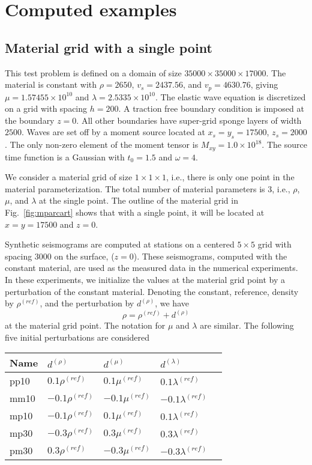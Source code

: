 \documentclass[12pt]{report}
\begin{document}
\chapter{Computed examples}

\section{Material grid with a single point}
This test problem is defined on a domain of size $35000\times 35000\times 17000$.
The material is constant with $\rho=2650$, $v_s=2437.56$, and $v_p=4630.76$, giving
$\mu=1.57455\times 10^{10}$ and $\lambda=2.5335\times 10^{10}$. The elastic wave equation 
is discretized on a grid with spacing $h=200$. A traction free boundary condition is 
imposed at the boundary $z=0$. All other boundaries have super-grid sponge layers of width $2500$.
Waves are set off by a moment source located at $x_s=y_s=17500$, $z_s=2000$. The only
non-zero element of the moment tensor is $M_{xy}=1.0\times 10^{18}$. The source time function
is a Gaussian with $t_0=1.5$ and $\omega=4$.
\par
We consider a material grid of size $1\times 1 \times 1$, i.e., there is only one point
in the material parameterization. 
The total number of material parameters is 3, i.e., $\rho$, $\mu$, and $\lambda$ at the 
single point. The outline of the material grid in Fig.~\ref{fig:mparcart} shows that with
a single point, it will be located at $x=y=17500$ and $z=0$.
\par
Synthetic seismograms are computed at stations on a centered $5\times 5$ grid with spacing $3000$ 
on the surface, ($z=0$). These seismograms, computed with the constant material, are used as the
measured data in the numerical experiments.
In these experiments, we initialize the values at the material grid point by a perturbation
of the constant material. Denoting the constant, reference, density by $\rho^{(ref)}$, and the perturbation
by $d^{(\rho)}$, we have
$$
  \rho    = \rho^{(ref)}+d^{(\rho)}
$$
at the material grid point. The notation for $\mu$ and $\lambda$ are similar.
The following five initial perturbations are considered
\begin{center}
\begin{tabular}{|l|l|l|l|l|} \hline
{\bf Name} & $d^{(\rho)}$ & $d^{(\mu)}$ & $d^{(\lambda)}$  \\ \hline 
pp10 & $0.1\rho^{(ref)}$ & $0.1\mu^{(ref)}$ & $0.1\lambda^{(ref)}$ \\ \hline
mm10 & $-0.1\rho^{(ref)}$ & $-0.1\mu^{(ref)}$ & $-0.1\lambda^{(ref)}$ \\ \hline
mp10 & $-0.1\rho^{(ref)}$ & $0.1\mu^{(ref)}$ & $0.1\lambda^{(ref)}$ \\ \hline
mp30 & $-0.3\rho^{(ref)}$ & $0.3\mu^{(ref)}$ & $0.3\lambda^{(ref)}$ \\ \hline
pm30 & $0.3\rho^{(ref)}$ & $-0.3\mu^{(ref)}$ & $-0.3\lambda^{(ref)}$ \\ \hline
\end{tabular}
\label{tab:cases}
\end{center}
\end{document}
